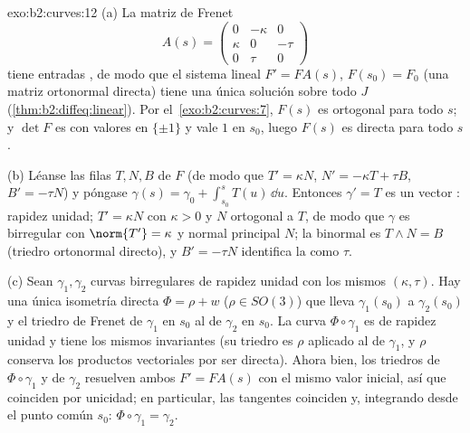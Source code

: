 \begin{solution}{exo:b2:curves:12}
(a) La matriz de Frenet
\[
A(s) = \begin{pmatrix} 0 & -\kappa & 0\\ \kappa & 0 & -\tau\\
0 & \tau & 0\end{pmatrix}
\]
tiene entradas , de modo que el sistema lineal $F' =
FA(s)$, $F(s_0) = F_0$ (una matriz ortonormal directa) tiene una
única solución sobre todo $J$ (\cref{thm:b2:diffeq:linear}). Por el~\cref{exo:b2:curves:7}, $F(s)$ es ortogonal para todo $s$; y $\det F$
es  con valores en $\{\pm1\}$ y vale $1$ en $s_0$, luego
$F(s)$ es directa para todo $s$.

(b) Léanse las filas $T, N, B$ de $F$ (de modo que $T' = \kappa N$,
$N' = -\kappa T + \tau B$, $B' = -\tau N$) y póngase $\gamma(s) =
\gamma_0 + \int_{s_0}^s T(u)\,\dd u$. Entonces $\gamma' = T$ es un
vector : rapidez unidad; $T' = \kappa N$ con $\kappa > 0$ y
$N$  ortogonal a $T$, de modo que $\gamma$ es birregular con
 $\norm{T'} = \kappa$ y normal principal $N$; la binormal
es $T \wedge N = B$ (triedro ortonormal directo), y $B' = -\tau N$
identifica la  como $\tau$.

(c) Sean $\gamma_1, \gamma_2$ curvas birregulares de rapidez unidad
con los mismos $(\kappa, \tau)$. Hay una única isometría directa
$\Phi = \rho + w$ ($\rho \in SO(3)$) que lleva $\gamma_1(s_0)$ a
$\gamma_2(s_0)$ y el triedro de Frenet de $\gamma_1$ en $s_0$ al de
$\gamma_2$ en $s_0$. La curva $\Phi\circ\gamma_1$ es de rapidez
unidad y tiene los mismos invariantes (su triedro es $\rho$ aplicado
al de $\gamma_1$, y $\rho$ conserva los productos vectoriales por ser
directa). Ahora bien, los triedros de $\Phi\circ\gamma_1$ y de
$\gamma_2$ resuelven ambos $F' = FA(s)$ con el mismo valor inicial,
así que coinciden por unicidad; en particular, las tangentes
coinciden y, integrando desde el punto común $s_0$:
$\Phi\circ\gamma_1 = \gamma_2$.
\end{solution}

